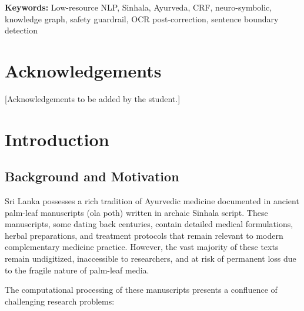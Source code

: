 \documentclass[12pt, a4paper, twoside]{report}
\begin{document}
\textbf{Keywords:} Low-resource NLP, Sinhala, Ayurveda, CRF, neuro-symbolic, knowledge graph, safety guardrail, OCR post-correction, sentence boundary detection

\chapter*{Acknowledgements}

[Acknowledgements to be added by the student.]

\tableofcontents
\listoffigures
\listoftables

\chapter{Introduction}
\label{ch:introduction}

\section{Background and Motivation}
\label{sec:background}

Sri Lanka possesses a rich tradition of Ayurvedic medicine documented in ancient palm-leaf manuscripts (ola poth) written in archaic Sinhala script. These manuscripts, some dating back centuries, contain detailed medical formulations, herbal preparations, and treatment protocols that remain relevant to modern complementary medicine practice. However, the vast majority of these texts remain undigitized, inaccessible to researchers, and at risk of permanent loss due to the fragile nature of palm-leaf media.

The computational processing of these manuscripts presents a confluence of challenging research problems:
\end{document}
